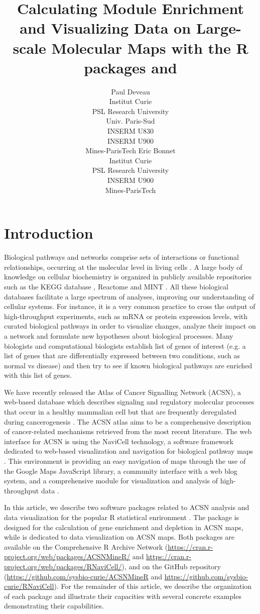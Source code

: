 \documentclass[article]{jss}
\author{Paul Deveau\\Institut Curie\\PSL Research University\\Univ. Paris-Sud\\INSERM U830\\INSERM U900\\Mines-ParisTech \And 
        Eric Bonnet\\Institut Curie\\PSL Research University\\INSERM U900\\Mines-ParisTech}
\title{Calculating Module Enrichment and Visualizing Data on Large-scale Molecular Maps with the R packages \pkg{ACSNMineR} and \pkg{RNaviCell}}
\begin{document}

\section[Introduction]{Introduction}
Biological pathways and networks comprise sets of interactions or functional
relationships, occurring at the molecular level in living cells
\citep{adriaens2008public}.  A large body of knowledge on cellular biochemistry
is organized in publicly available repositories such as the KEGG database
\citep{kanehisa2011kegg}, Reactome \citep{croft2014reactome} and MINT
\citep{zanzoni2002mint}. All these biological databases facilitate a large
spectrum of analyses, improving our understanding of cellular systems. For
instance, it is a very common practice to cross the output of high-throughput
experiments, such as mRNA or protein expression levels, with curated biological
pathways in order to visualize changes, analyze their impact on a network and
formulate new hypotheses about biological processes. Many biologists and
computational biologists establish list of genes of interest (e.g. a list of
genes that are differentially expressed between two conditions, such as normal
vs disease) and then try to see if known biological pathways are enriched with
this list of genes. 

We have recently released the Atlas of Cancer Signalling Network (ACSN), a
web-based database which describes signaling and regulatory molecular processes
that occur in a healthy mammalian cell but that are frequently deregulated
during cancerogenesis \citep{kuperstein2013navicell}.  The ACSN atlas aims to
be a comprehensive description of cancer-related mechanisms retrieved from the
most recent literature. The web interface for ACSN is using the NaviCell
technology, a software framework dedicated to web-based visualization and
navigation for biological pathway maps \citep{kuperstein2013navicell}. This
environment is providing an easy navigation of maps through the use of the
Google Maps JavaScript library, a community interface with a web blog system,
and a comprehensive module for visualization and analysis of high-throughput
data \citep{bonnet2015navicell}.


In this article, we describe two software packages related to ACSN analysis and
data visualization for the popular R statistical enrironment \citep{mainRref,
vance2009data}. The package  is designed for the calculation of
gene enrichment and depletion in ACSN maps, while  is dedicated
to data visualization on ACSN maps. Both packages are available on the
Comprehensive R Archive Network
(\url{https://cran.r-project.org/web/packages/ACSNMineR/} and
\url{https://cran.r-project.org/web/packages/RNaviCell/}), and on the GitHub
repository (\url{https://github.com/sysbio-curie/ACSNMineR} and
\url{https://github.com/sysbio-curie/RNaviCell}). For the remainder of this
article, we describe the organization of each package and illustrate their
capacities with several concrete examples demonstrating their capabilities. 
\end{document}
